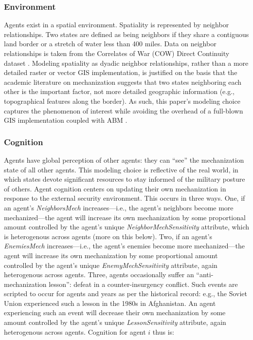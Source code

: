 \documentclass{article}
\begin{document}
\subsubsection{Environment}

Agents exist in a spatial environment. Spatiality is represented by neighbor
relationships. Two states are defined as
being neighbors if they share a contiguous land border or a stretch of water
less than 400 miles. Data on neighbor relationships is taken from the Correlates
of War (COW) Direct Continuity dataset \citep{cow_contiguity}.
Modeling spatiality as dyadic neighbor relationships, rather than a more
detailed raster or vector GIS implementation, is justified on the basis that the
academic literature on mechanization suggests that two states neighboring each
other is the important factor, not more detailed geographic information (e.g.,
topographical features along the border). As such, this paper's modeling choice
captures the phenomenon of interest while avoiding the overhead of a full-blown
GIS implementation coupled with ABM \citep[e.g.][]{harper2002modeling,bennett2006modelling}.

\subsubsection{Cognition}

Agents have global perception of other agents: they can ``see'' the
mechanization state of all other agents. This modeling choice is reflective of
the real world, in which states devote significant resources to stay informed of
the military posture of others. Agent cognition centers on 
updating their own mechanization in response to the external security
environment. This occurs in three ways. One, if an agent's
\textit{NeighborsMech} increases---i.e., the agent's neighbors become more
mechanized---the agent will increase its own mechanization by some proportional
amount controlled by the agent's unique \textit{NeighborMechSensitivity}
attribute, which is heterogenous across agents (more on this below).
Two, if an agent's
\textit{EnemiesMech} increases---i.e., the agent's enemies become more
mechanized---the agent will increase its own mechanization by some proportional
amount controlled by the agent's unique \textit{EnemyMechSensitivity} attribute,
again heterogenous across agents. Three,
agents occasionally suffer an ``anti-mechanization lesson'': defeat in a
counter-insurgency conflict. Such events are scripted to occur for agents and
years as per the historical record: e.g., the Soviet Union experienced such a
lesson in the 1980s in Afghanistan. An agent experiencing such an event will
decrease their own mechanization by some amount controlled by the agent's
unique \textit{LessonSensitivity} attribute, again heterogenous across agents.
Cognition for agent $i$ thus is:
\end{document}
